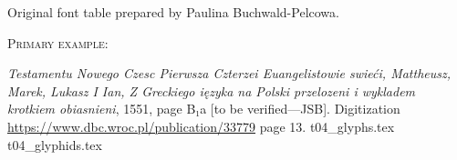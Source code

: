 \documentclass[12pt]{article}
\newcommand{\bg}{\begingl}
\begin{document}
\newpage


  \begin{flushleft}
    \label{fig:t02}
    
    \medskip
    
      Original font table prepared by Paulina Buchwald-Pelcowa.

      \bigskip

        \textsc{Primary example:}

  \textit{Testamentu Nowego Czesc Pierwsza Czterzei Euangelistowie
    swieći, Mattheusz, Marek, Lukasz I Ian, Z Greckiego ięzyka na
    Polski przelozeni i wykladem krotkiem obiasnieni}, 1551, page
  {\Junicode B₁a} [to be verified---JSB].  Digitization
  \url{https://www.dbc.wroc.pl/publication/33779} page 13.
 {t04_glyphs.tex}
 {t04_glyphids.tex}

\end{flushleft}
\end{document}
